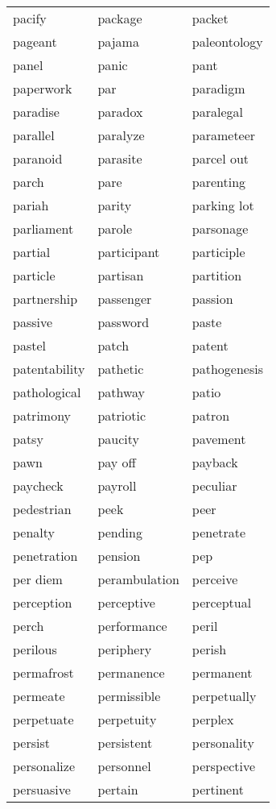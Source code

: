 \documentclass{minimal}
\begin{document}
\begin{longtable}{p{2.7cm}@{\hskip 0.2cm}p{2.7cm}@{\hskip 0.2cm}p{2.7cm}}
pacify & package & packet \\
pageant & pajama & paleontology \\
panel & panic & pant \\
paperwork & par & paradigm \\
paradise & paradox & paralegal \\
parallel & paralyze & parameteer \\
paranoid & parasite & parcel out \\
parch & pare & parenting \\
pariah & parity & parking lot \\
parliament & parole & parsonage \\
partial & participant & participle \\
particle & partisan & partition \\
partnership & passenger & passion \\
passive & password & paste \\
pastel & patch & patent \\
patentability & pathetic & pathogenesis \\
pathological & pathway & patio \\
patrimony & patriotic & patron \\
patsy & paucity & pavement \\
pawn & pay off & payback \\
paycheck & payroll & peculiar \\
pedestrian & peek & peer \\
penalty & pending & penetrate \\
penetration & pension & pep \\
per diem & perambulation & perceive \\
perception & perceptive & perceptual \\
perch & performance & peril \\
perilous & periphery & perish \\
permafrost & permanence & permanent \\
permeate & permissible & perpetually \\
perpetuate & perpetuity & perplex \\
persist & persistent & personality \\
personalize & personnel & perspective \\
persuasive & pertain & pertinent \\

\end{longtable}
\end{document}
